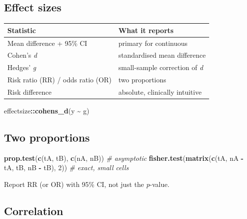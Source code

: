 \documentclass[
]{article}
\newenvironment{Shaded}{\begin{snugshade}}{\end{snugshade}}
\newcommand{\CommentTok}[1]{\textcolor[rgb]{0.56,0.35,0.01}{\textit{#1}}}
\newcommand{\DecValTok}[1]{\textcolor[rgb]{0.00,0.00,0.81}{#1}}
\newcommand{\FunctionTok}[1]{\textcolor[rgb]{0.13,0.29,0.53}{\textbf{#1}}}
\newcommand{\NormalTok}[1]{#1}
\newcommand{\SpecialCharTok}[1]{\textcolor[rgb]{0.81,0.36,0.00}{\textbf{#1}}}
\newcounter{none} %
\begin{document}
\subsection{Effect sizes}\label{effect-sizes}

{\def\LTcaptype{none} %
\begin{longtable}[]{@{}ll@{}}
\toprule\noalign{}
Statistic & What it reports \\
\midrule\noalign{}
\endhead
\bottomrule\noalign{}
\endlastfoot
Mean difference + 95\% CI & primary for continuous \\
Cohen's \emph{d} & standardised mean difference \\
Hedges' \emph{g} & small-sample correction of \emph{d} \\
Risk ratio (RR) / odds ratio (OR) & two proportions \\
Risk difference & absolute, clinically intuitive \\
\end{longtable}
}

\begin{Shaded}
\begin{Highlighting}[]
\NormalTok{effectsize}\SpecialCharTok{::}\FunctionTok{cohens\_d}\NormalTok{(y }\SpecialCharTok{\textasciitilde{}}\NormalTok{ g)}
\end{Highlighting}
\end{Shaded}

\subsection{Two proportions}\label{two-proportions}

\begin{Shaded}
\begin{Highlighting}[]
\FunctionTok{prop.test}\NormalTok{(}\FunctionTok{c}\NormalTok{(tA, tB), }\FunctionTok{c}\NormalTok{(nA, nB))         }\CommentTok{\# asymptotic}
\FunctionTok{fisher.test}\NormalTok{(}\FunctionTok{matrix}\NormalTok{(}\FunctionTok{c}\NormalTok{(tA, nA }\SpecialCharTok{{-}}\NormalTok{ tA,}
\NormalTok{                     tB, nB }\SpecialCharTok{{-}}\NormalTok{ tB), }\DecValTok{2}\NormalTok{))  }\CommentTok{\# exact, small cells}
\end{Highlighting}
\end{Shaded}

Report RR (or OR) with 95\% CI, not just the \emph{p}-value.

\subsection{Correlation}\label{correlation}
\end{document}
